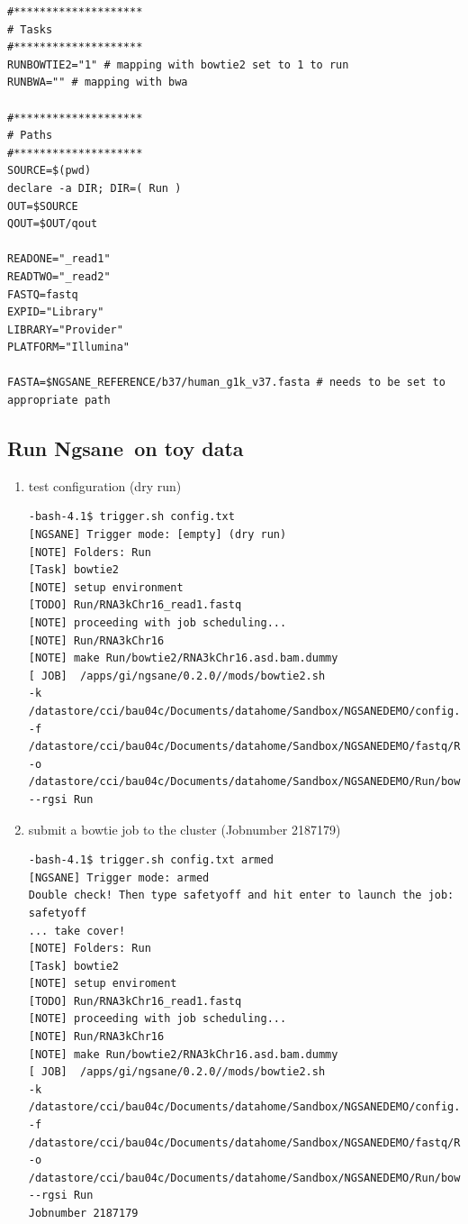 \documentclass{article}
\newcommand{\prog}{{\sc Ngsane}}
\begin{document}
\begin{enumerate}
\begin{small}
\begin{verbatim}
#********************
# Tasks
#********************
RUNBOWTIE2="1" # mapping with bowtie2 set to 1 to run
RUNBWA="" # mapping with bwa

#********************
# Paths
#********************
SOURCE=$(pwd)
declare -a DIR; DIR=( Run )
OUT=$SOURCE
QOUT=$OUT/qout

READONE="_read1"
READTWO="_read2"
FASTQ=fastq
EXPID="Library"
LIBRARY="Provider"
PLATFORM="Illumina"

FASTA=$NGSANE_REFERENCE/b37/human_g1k_v37.fasta # needs to be set to appropriate path

\end{verbatim}\end{small}
\end{enumerate}

\subsection{Run \prog\ on toy data}
\begin{enumerate}
\item test configuration (dry run)
\begin{small}\begin{verbatim}
-bash-4.1$ trigger.sh config.txt
[NGSANE] Trigger mode: [empty] (dry run)
[NOTE] Folders: Run
[Task] bowtie2
[NOTE] setup environment
[TODO] Run/RNA3kChr16_read1.fastq
[NOTE] proceeding with job scheduling...
[NOTE] Run/RNA3kChr16
[NOTE] make Run/bowtie2/RNA3kChr16.asd.bam.dummy
[ JOB]  /apps/gi/ngsane/0.2.0//mods/bowtie2.sh 
-k /datastore/cci/bau04c/Documents/datahome/Sandbox/NGSANEDEMO/config.txt 
-f /datastore/cci/bau04c/Documents/datahome/Sandbox/NGSANEDEMO/fastq/Run/RNA3kChr16_read1.fastq 
-o /datastore/cci/bau04c/Documents/datahome/Sandbox/NGSANEDEMO/Run/bowtie2 --rgsi Run
\end{verbatim}\end{small}
\item submit a bowtie job to the cluster (Jobnumber 2187179)
\begin{small}\begin{verbatim}
-bash-4.1$ trigger.sh config.txt armed
[NGSANE] Trigger mode: armed
Double check! Then type safetyoff and hit enter to launch the job: safetyoff
... take cover!
[NOTE] Folders: Run
[Task] bowtie2
[NOTE] setup enviroment
[TODO] Run/RNA3kChr16_read1.fastq
[NOTE] proceeding with job scheduling...
[NOTE] Run/RNA3kChr16
[NOTE] make Run/bowtie2/RNA3kChr16.asd.bam.dummy
[ JOB]  /apps/gi/ngsane/0.2.0//mods/bowtie2.sh 
-k /datastore/cci/bau04c/Documents/datahome/Sandbox/NGSANEDEMO/config.txt 
-f /datastore/cci/bau04c/Documents/datahome/Sandbox/NGSANEDEMO/fastq/Run/RNA3kChr16_read1.fastq 
-o /datastore/cci/bau04c/Documents/datahome/Sandbox/NGSANEDEMO/Run/bowtie2 --rgsi Run
Jobnumber 2187179
\end{verbatim}\end{small}
\end{enumerate}
\end{document}
